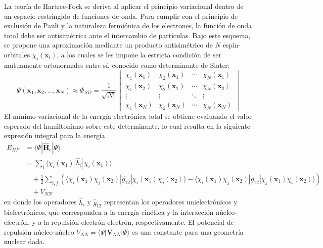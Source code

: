 La teoría de Hartree-Fock se deriva al aplicar el principio variacional dentro de un espacio restringido de funciones de onda. Para cumplir con el principio de exclusión de Pauli y la naturaleza fermiónica de los electrones, la función de onda total debe ser antisimétrica ante el intercambio de partículas. Bajo este esquema, se propone una aproximación mediante un producto antisimétrico de $N$ espín-orbitales $\chi_i(\mathbf{x}_i)$, a los cuales se les impone la estricta condición de ser mutuamente ortonormales entre sí, conocido como determinante de Slater:
\begin{equation}
    \Psi (\mathbf{x}_1, \mathbf{x}_2, \ldots, \mathbf{x}_N) \approx \Phi_{SD} = \frac{1}{\sqrt{N!}} 
    \begin{vmatrix}
        \chi_1(\mathbf{x}_1) & \chi_2(\mathbf{x}_1) & \cdots & \chi_N(\mathbf{x}_1) \\
        \chi_1(\mathbf{x}_2) & \chi_2(\mathbf{x}_2) & \cdots & \chi_N(\mathbf{x}_2) \\
        \vdots & \vdots & \ddots & \vdots \\
        \chi_1(\mathbf{x}_N) & \chi_2(\mathbf{x}_N) & \cdots & \chi_N(\mathbf{x}_N) 
    \end{vmatrix}
    \label{eq:determinante_slater}
\end{equation}
El mínimo variacional de la energía electrónica total se obtiene evaluando el valor esperado del hamiltoniano sobre este determinante, lo cual resulta en la siguiente expresión integral para la energía
\begin{align}
    E_{HF} &= \langle \Psi | \hat{\mathbf{H}}_e | \Psi \rangle \nonumber \\
    &= \sum_{i} \langle \chi_i(\mathbf{x}_1) | \hat{h}_i | \chi_i(\mathbf{x}_1) \rangle \nonumber \\
    &\quad + \frac{1}{2} \sum_{i,j} \left( \langle \chi_i(\mathbf{x}_1)\chi_j(\mathbf{x}_2) | \hat{g}_{12} | \chi_i(\mathbf{x}_1)\chi_j(\mathbf{x}_2) \rangle - \langle \chi_i(\mathbf{x}_1)\chi_j(\mathbf{x}_2) | \hat{g}_{12} | \chi_j(\mathbf{x}_1)\chi_i(\mathbf{x}_2) \rangle \right) \nonumber \\
    &\quad + V_{NN} 
    \label{eq:hf_energy}
\end{align}
en donde los operadores $\hat{h}_i$ y $\hat{g}_{12}$ representan los operadores unielectrónicos y bielectrónicos, que corresponden a la energía cinética y la interacción núcleo-electrón, y a la repulsión electrón-electrón, respectivamente. El potencial de repulsión núcleo-núcleo $V_{NN} = \langle \Psi | \mathbf{V}_{NN} | \Psi \rangle  $ es una constante para una geometría nuclear dada. 

